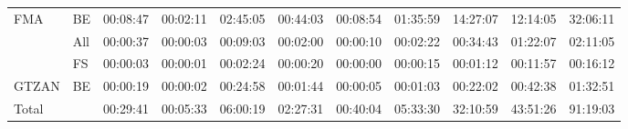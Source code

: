 \begin{table}[H]
{\begin{tabular}{lllllllllll}
    \multirow{-3}{*}{FMA}   & \multicolumn{1}{l|}{\cellcolor[HTML]{EFEFEF}BE}  & \cellcolor[HTML]{EFEFEF}00:08:47 & \cellcolor[HTML]{EFEFEF}00:02:11 & \cellcolor[HTML]{EFEFEF}02:45:05 & \cellcolor[HTML]{EFEFEF}00:44:03 & \cellcolor[HTML]{EFEFEF}00:08:54 & \cellcolor[HTML]{EFEFEF}01:35:59 & \cellcolor[HTML]{EFEFEF}14:27:07 & \cellcolor[HTML]{EFEFEF}12:14:05 & \cellcolor[HTML]{EFEFEF}32:06:11 \\ \cline{1-2}
                            & \multicolumn{1}{l|}{All}                         & 00:00:37                         & 00:00:03                         & 00:09:03                         & 00:02:00                         & 00:00:10                         & 00:02:22                         & 00:34:43                         & 01:22:07                         & 02:11:05                         \\
                            & \multicolumn{1}{l|}{\cellcolor[HTML]{EFEFEF}FS}  & \cellcolor[HTML]{EFEFEF}00:00:03 & \cellcolor[HTML]{EFEFEF}00:00:01 & \cellcolor[HTML]{EFEFEF}00:02:24 & \cellcolor[HTML]{EFEFEF}00:00:20 & \cellcolor[HTML]{EFEFEF}00:00:00 & \cellcolor[HTML]{EFEFEF}00:00:15 & \cellcolor[HTML]{EFEFEF}00:01:12 & \cellcolor[HTML]{EFEFEF}00:11:57 & \cellcolor[HTML]{EFEFEF}00:16:12 \\
    \multirow{-3}{*}{GTZAN} & \multicolumn{1}{l|}{BE}                          & 00:00:19                         & 00:00:02                         & 00:24:58                         & 00:01:44                         & 00:00:05                         & 00:01:03                         & 00:22:02                         & 00:42:38                         & 01:32:51                         \\ \cline{1-2}
    \multicolumn{2}{l|}{Total}                                                 & \cellcolor[HTML]{EFEFEF}00:29:41 & \cellcolor[HTML]{EFEFEF}00:05:33 & \cellcolor[HTML]{EFEFEF}06:00:19 & \cellcolor[HTML]{EFEFEF}02:27:31 & \cellcolor[HTML]{EFEFEF}00:40:04 & \cellcolor[HTML]{EFEFEF}05:33:30 & \cellcolor[HTML]{EFEFEF}32:10:59 & \cellcolor[HTML]{EFEFEF}43:51:26 & \cellcolor[HTML]{EFEFEF}91:19:03
    \end{tabular}}
\end{table}

